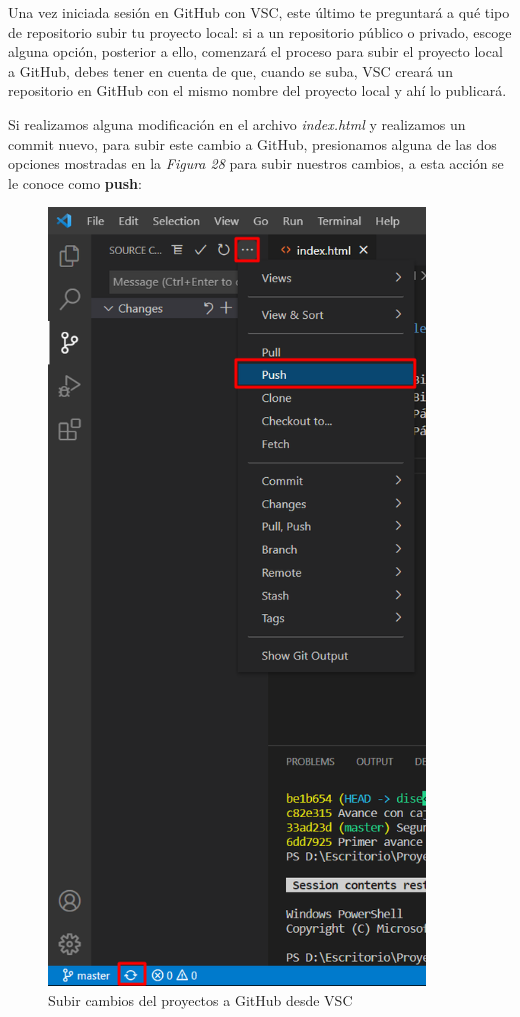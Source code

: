 Una vez iniciada sesión en GitHub con VSC, este último te preguntará a qué tipo de repositorio subir tu proyecto local: si a un repositorio público o privado, escoge alguna opción, posterior a ello, comenzará el proceso para subir el proyecto local a GitHub, debes tener en cuenta de que, cuando se suba, VSC creará un repositorio en GitHub con el mismo nombre del proyecto local y ahí lo publicará.

Si realizamos alguna modificación en el archivo \textit{index.html} y realizamos un commit nuevo, para subir este cambio a GitHub, presionamos alguna de las dos opciones mostradas en la \textit{Figura 28} para subir nuestros cambios, a esta acción se le conoce como \textbf{push}:
\begin{figure}[H]
    \begin{center}
        \caption{Subir cambios del proyectos a GitHub desde VSC}
        \label{fig: 28}
        \includegraphics[width=10cm]{capturas/subir_proyecto2.png}
    \end{center}
\end{figure}

